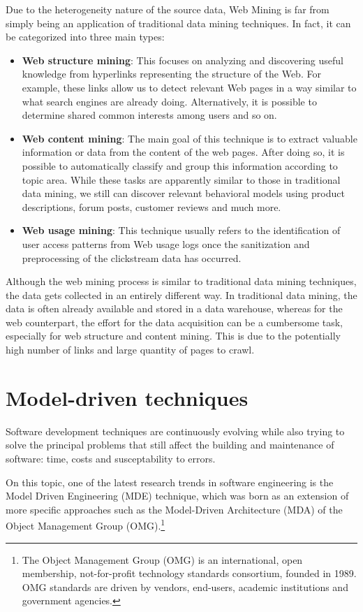 Due to the heterogeneity nature of the source data, Web Mining is far from simply being an application of traditional data mining techniques. In fact, it can be categorized into three main types:

\begin{itemize}
  \item \textbf{Web structure mining}:  This focuses on analyzing and discovering useful knowledge from hyperlinks representing the structure of the Web. For example, these links allow us to detect relevant Web pages in a way similar to what search engines are already doing. Alternatively, it is possible to determine shared common interests among users and so on.
  \item \textbf{Web content mining}: The main goal of this technique is to extract valuable information or data from the content of the web pages. After doing so, it is possible to automatically classify and group this information according to topic area. While these tasks are apparently similar to those in traditional data mining, we still can discover relevant behavioral models using product descriptions, forum posts, customer reviews and much more.
  \item \textbf{Web usage mining}: This technique usually refers to the identification of user access patterns from Web usage logs once the sanitization and preprocessing of the clickstream data has occurred.
\end{itemize} 



Although the web mining process is similar to traditional data mining techniques, the data gets collected in an entirely different way. In traditional data mining, the data is often already available and stored in a data warehouse, whereas for the web counterpart, the effort for the data acquisition can be a cumbersome task, especially for web structure and content mining. This is due to the potentially high number of links and large quantity of pages to crawl.

\section{Model-driven techniques}

Software development techniques are continuously evolving while also trying to solve the principal problems that still affect the building and maintenance of software: time, costs and susceptability to errors.

On this topic, one of the latest research trends in software engineering is the Model Driven Engineering (MDE) technique, which was born as an extension of more specific approaches such as the Model-Driven Architecture (MDA) of the Object Management Group (OMG).\footnote{The Object Management Group (OMG) is an international, open membership, not-for-profit technology standards consortium, founded in 1989. OMG standards are driven by vendors, end-users, academic institutions and government agencies. } 

